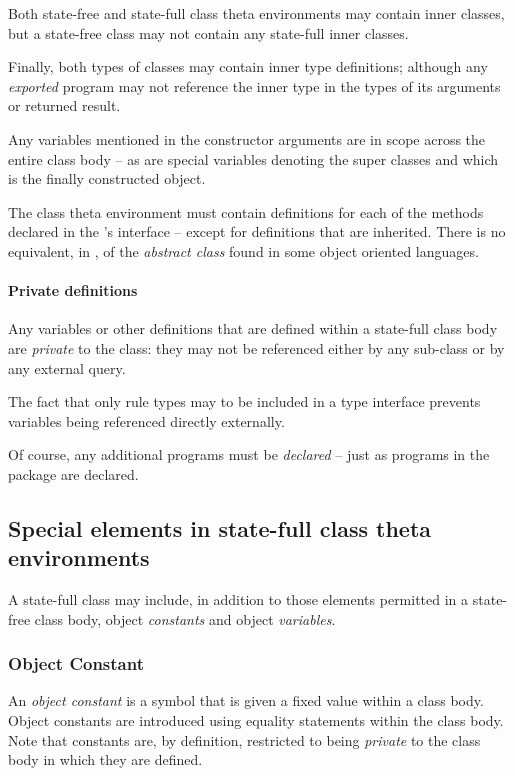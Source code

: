 Both state-free and state-full class theta environments may contain inner classes, but a state-free class may not contain any state-full inner classes.

Finally, both types of classes may contain inner type definitions; although any \emph{exported} program may not reference the inner type in the types of its arguments or returned result.

Any variables mentioned in the constructor arguments are in scope across the entire class body -- as are special variables denoting the super classes and  which is the finally constructed object.

The class theta environment must contain definitions for each of the methods declared in the \emph{}'s interface -- except for definitions that are inherited. There is no equivalent, in \go, of the \emph{abstract class} found in some object oriented languages.

\paragraph{Private definitions}
Any variables or other definitions that are defined within a state-full class body are \emph{private} to the class: they may not be referenced either by any sub-class or by any external query.
\begin{aside}
The fact that only rule types may to be included in a type interface prevents variables being referenced directly externally.
\end{aside}

Of course, any additional programs must be \emph{declared} -- just as programs in the package are declared.

\subsection{Special elements in state-full class theta environments}
A state-full class may include, in addition to those elements permitted in a state-free class body, object \emph{constants} and object \emph{variables}.

\subsubsection{Object Constant}
\label{lo:constant}
An \emph{object constant} is a symbol that is given a fixed value within a class body. Object constants are introduced using equality statements within the class body. Note that constants are, by definition, restricted to being \emph{private} to the class body in which they are defined.

